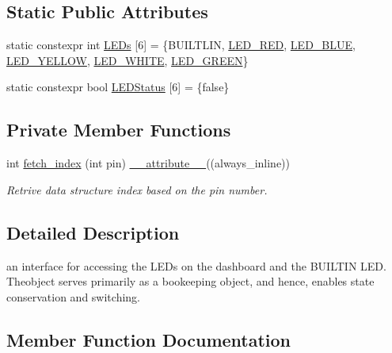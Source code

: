 \subsection*{Static Public Attributes}
\begin{DoxyCompactItemize}
\item 
static constexpr int \hyperlink{classLEDSet_a702b4369ddb5d8f4ca59056ebb6c4617}{L\+E\+Ds} \mbox{[}6\mbox{]} = \{B\+U\+I\+L\+T\+L\+IN, \hyperlink{pins_8hpp_a735f426a390e22c0050b964328c5e06f}{L\+E\+D\+\_\+\+R\+ED}, \hyperlink{pins_8hpp_a8046eca6ddcbe578777cfde489622a13}{L\+E\+D\+\_\+\+B\+L\+UE}, \hyperlink{pins_8hpp_af338796c804fbfe2e9fd4d249e3c5004}{L\+E\+D\+\_\+\+Y\+E\+L\+L\+OW}, \hyperlink{pins_8hpp_a1be903f86639d50fb6ed02a0dbbe0e2c}{L\+E\+D\+\_\+\+W\+H\+I\+TE}, \hyperlink{pins_8hpp_a8d7df4222b2fde6205bebffc5a0ae070}{L\+E\+D\+\_\+\+G\+R\+E\+EN}\}
\item 
static constexpr bool \hyperlink{classLEDSet_a9a38ca32395095475ed89e7eea01e990}{L\+E\+D\+Status} \mbox{[}6\mbox{]} = \{false\}
\end{DoxyCompactItemize}
\subsection*{Private Member Functions}
\begin{DoxyCompactItemize}
\item 
int \hyperlink{classLEDSet_a2ab948b2ac81a4b4e0ace4b51579ad86}{fetch\+\_\+index} (int pin) \hyperlink{utilities_8hpp_a103d5b3998e0dd804213c8f30a094f4d}{\+\_\+\+\_\+attribute\+\_\+\+\_\+}((always\+\_\+inline))
\begin{DoxyCompactList}\small\item\em Retrive data structure index based on the pin number. \end{DoxyCompactList}\end{DoxyCompactItemize}


\subsection{Detailed Description}
an interface for accessing the L\+E\+Ds on the dashboard and the B\+U\+I\+L\+T\+IN L\+ED. Theobject serves primarily as a bookeeping object, and hence, enables state conservation and switching. 

\subsection{Member Function Documentation}
\mbox{\label{classLEDSet_a44ecd0c2c70984a4fade72e0bb79f059}} 
